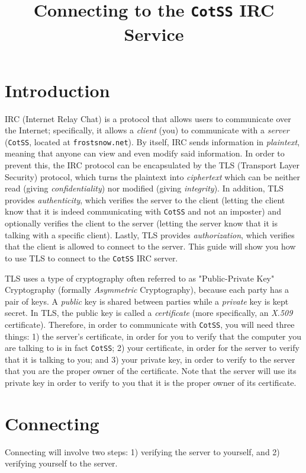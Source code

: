 \documentclass{article}
\begin{document}
\title{Connecting to the \texttt{CotSS} IRC Service}

\maketitle

\section{Introduction}
IRC (Internet Relay Chat) is a protocol that allows users to communicate over the Internet; specifically, it allows a \textit{client} (you) to communicate with a \textit{server} (\texttt{CotSS}, located at \texttt{frostsnow.net}).  By itself, IRC sends information in \textit{plaintext}, meaning that anyone can view and even modify said information.  In order to prevent this, the IRC protocol can be encapsulated by the TLS (Transport Layer Security) protocol, which turns the plaintext into \textit{ciphertext} which can be neither read (giving \textit{confidentiality}) nor modified (giving \textit{integrity}).  In addition, TLS provides \textit{authenticity}, which verifies the server to the client (letting the client know that it is indeed communicating with \texttt{CotSS} and not an imposter) and optionally verifies the client to the server (letting the server know that it is talking with a specific client).  Lastly, TLS provides \textit{authorization}, which verifies that the client is allowed to connect to the server.  This guide will show you how to use TLS to connect to the \texttt{CotSS} IRC server.

TLS uses a type of cryptography often referred to as "Public-Private Key" Cryptography (formally \textit{Asymmetric} Cryptography), because each party has a pair of keys.  A \textit{public} key is shared between parties while a \textit{private} key is kept secret.  In TLS, the public key is called a \textit{certificate} (more specifically, an \textit{X.509} certificate).  Therefore, in order to communicate with \texttt{CotSS}, you will need three things: 1) the server's certificate, in order for you to verify that the computer you are talking to is in fact \texttt{CotSS}; 2) your certificate, in order for the server to verify that it is talking to you; and 3) your private key, in order to verify to the server that you are the proper owner of the certificate.  Note that the server will use its private key in order to verify to you that it is the proper owner of its certificate.

\section{Connecting}
Connecting will involve two steps: 1) verifying the server to yourself, and 2) verifying yourself to the server.
\end{document}
